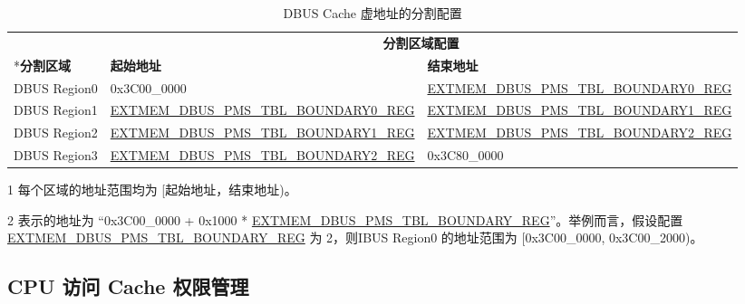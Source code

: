 \documentclass[main\_\_CN.tex]{subfiles}
\begin{document}
\begin{table}[H]
    \centering
    \caption{DBUS Cache 虚地址的分割配置}
    \label{tab:dbus_acs_cache_region_config}
    \begin{threeparttable}
    \begin{tabular}{ | l | l | l |}
    \hline
        \rowcolor{lightgray}
         & \multicolumn{2}{c|}{\textbf{分割区域配置}} \\\cline{2-3}
        \rowcolor{lightgray}
        \multirow{-2}*{\textbf{分割区域}\tnote{1}} & \textbf{起始地址} & \textbf{结束地址}\\\hline
        DBUS Region0  & 0x3C00\_0000                                                                          & \hyperref[regdesc:EXTMEMDBUSPMSTBLBOUNDARY0REG]{EXTMEM\_DBUS\_PMS\_TBL\_BOUNDARY0\_REG}\tnote{2} \\\hline
        DBUS Region1  & \hyperref[regdesc:EXTMEMDBUSPMSTBLBOUNDARY0REG]{EXTMEM\_DBUS\_PMS\_TBL\_BOUNDARY0\_REG}\tnote{2} & \hyperref[regdesc:EXTMEMDBUSPMSTBLBOUNDARY1REG]{EXTMEM\_DBUS\_PMS\_TBL\_BOUNDARY1\_REG}\tnote{2} \\\hline
        DBUS Region2  & \hyperref[regdesc:EXTMEMDBUSPMSTBLBOUNDARY1REG]{EXTMEM\_DBUS\_PMS\_TBL\_BOUNDARY1\_REG}\tnote{2} & \hyperref[regdesc:EXTMEMDBUSPMSTBLBOUNDARY2REG]{EXTMEM\_DBUS\_PMS\_TBL\_BOUNDARY2\_REG}\tnote{2} \\\hline
        DBUS Region3  & \hyperref[regdesc:EXTMEMDBUSPMSTBLBOUNDARY2REG]{EXTMEM\_DBUS\_PMS\_TBL\_BOUNDARY2\_REG}\tnote{2} & 0x3C80\_0000 \\\hline
    \end{tabular}
    \begin{tablenotes}
        \item[1] 每个区域的地址范围均为 [起始地址，结束地址)。
        \item[2] 表示的地址为 “0x3C00\_0000 + 0x1000 * \hyperref[regdesc:EXTMEMDBUSPMSTBLBOUNDARY1REG]{EXTMEM\_DBUS\_PMS\_TBL\_BOUNDARY\_REG}”。举例而言，假设配置 \hyperref[regdesc:EXTMEMDBUSPMSTBLBOUNDARY1REG]{EXTMEM\_DBUS\_PMS\_TBL\_BOUNDARY\_REG} 为 2，则IBUS Region0 的地址范围为 [0x3C00\_0000, 0x3C00\_2000)。
        \end{tablenotes}
    \end{threeparttable}
\end{table}



\subsection{CPU 访问 Cache 权限管理}
\end{document}
